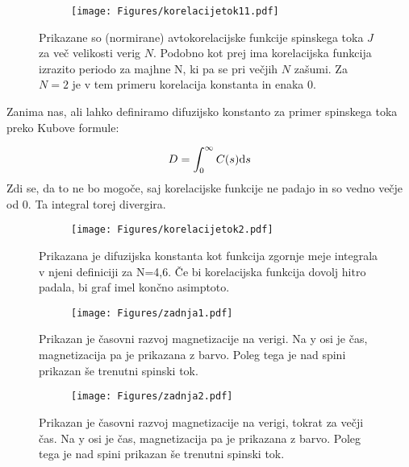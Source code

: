 \documentclass{article}
\begin{document}
\begin{figure}[H]
\centering
\begin{subfigure}{.7\textwidth}
\texttt{[image: Figures/korelacijetok11.pdf]}
\end{subfigure}
\caption*{Prikazane so (normirane) avtokorelacijske funkcije spinskega toka $J$ za več velikosti verig $N$. Podobno kot prej ima korelacijska funkcija izrazito periodo za majhne N, ki pa se pri večjih $N$ zašumi. Za $N=2$ je v tem primeru korelacija konstanta in enaka 0.}
\end{figure}

Zanima nas, ali lahko definiramo difuzijsko konstanto za primer spinskega toka preko Kubove formule:

\begin{equation*}
D = \int_0^\infty C(s) \textup{d}s
\end{equation*}
Zdi se, da to ne bo mogoče, saj korelacijske funkcije ne padajo in so vedno večje od 0. Ta integral torej divergira.

\begin{figure}[H]
\centering
\begin{subfigure}{.7\textwidth}
\texttt{[image: Figures/korelacijetok2.pdf]}
\end{subfigure}
\caption*{Prikazana je difuzijska konstanta kot funkcija zgornje meje integrala v njeni definiciji za N=4,6. Če bi korelacijska funkcija dovolj hitro padala, bi graf imel končno asimptoto.}
\end{figure}

\begin{figure}[H]
\centering
\begin{subfigure}{.7\textwidth}
\texttt{[image: Figures/zadnja1.pdf]}
\end{subfigure}
\caption*{Prikazan je časovni razvoj magnetizacije na verigi. Na y osi je čas, magnetizacija pa je prikazana z barvo. Poleg tega je nad spini prikazan še trenutni spinski tok.}
\end{figure}

\begin{figure}[H]
\centering
\begin{subfigure}{.7\textwidth}
\texttt{[image: Figures/zadnja2.pdf]}
\end{subfigure}
\caption*{Prikazan je časovni razvoj magnetizacije na verigi, tokrat za večji čas. Na y osi je čas, magnetizacija pa je prikazana z barvo. Poleg tega je nad spini prikazan še trenutni spinski tok.}
\end{figure}
\end{document}
